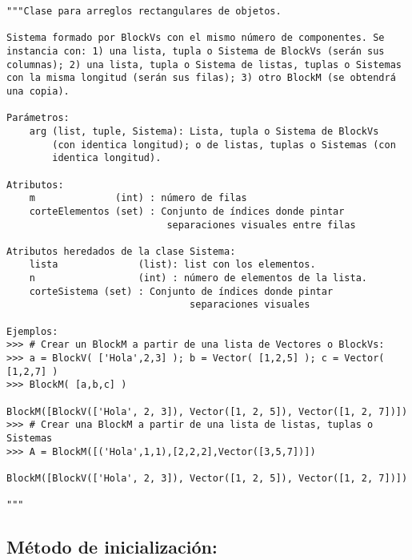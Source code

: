 \documentclass[11pt]{report}
\begin{document}
\begin{verbatim}
"""Clase para arreglos rectangulares de objetos.

Sistema formado por BlockVs con el mismo número de componentes. Se
instancia con: 1) una lista, tupla o Sistema de BlockVs (serán sus
columnas); 2) una lista, tupla o Sistema de listas, tuplas o Sistemas
con la misma longitud (serán sus filas); 3) otro BlockM (se obtendrá
una copia).

Parámetros:
    arg (list, tuple, Sistema): Lista, tupla o Sistema de BlockVs
        (con identica longitud); o de listas, tuplas o Sistemas (con
        identica longitud).

Atributos:
    m              (int) : número de filas
    corteElementos (set) : Conjunto de índices donde pintar
                            separaciones visuales entre filas

Atributos heredados de la clase Sistema:
    lista              (list): list con los elementos.
    n                  (int) : número de elementos de la lista.
    corteSistema (set) : Conjunto de índices donde pintar
                                separaciones visuales

Ejemplos:
>>> # Crear un BlockM a partir de una lista de Vectores o BlockVs:
>>> a = BlockV( ['Hola',2,3] ); b = Vector( [1,2,5] ); c = Vector( [1,2,7] )
>>> BlockM( [a,b,c] )

BlockM([BlockV(['Hola', 2, 3]), Vector([1, 2, 5]), Vector([1, 2, 7])])
>>> # Crear una BlockM a partir de una lista de listas, tuplas o Sistemas
>>> A = BlockM([('Hola',1,1),[2,2,2],Vector([3,5,7])])

BlockM([BlockV(['Hola', 2, 3]), Vector([1, 2, 5]), Vector([1, 2, 7])])

"""
\end{verbatim}

\subsection{Método de inicialización:}
\label{sec:org5eb7216}
\end{document}
